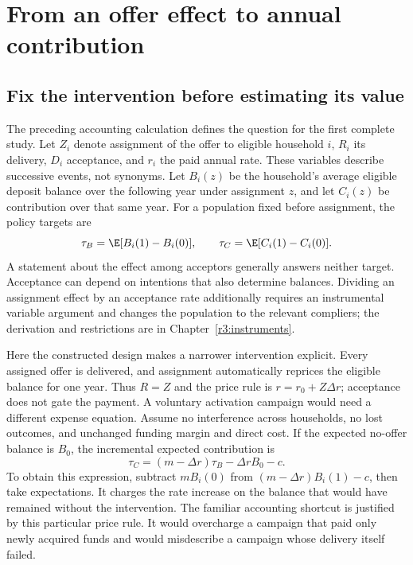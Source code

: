 \chapter{From an offer effect to annual contribution}
\label{rewrite:deposit}


\newcommand{\DepositEstimate}{1,183.47}
\newcommand{\DepositLow}{1,128.34}
\newcommand{\DepositHigh}{1,238.60}
\newcommand{\DepositNet}{2.55}
\newcommand{\DepositNetLow}{1.03}
\newcommand{\DepositNetHigh}{4.06}




\section{Fix the intervention before estimating its value}
The preceding accounting calculation defines the question for the first
complete study. Let $Z_i$ denote assignment of the offer to eligible household
$i$, $R_i$ its delivery, $D_i$ acceptance, and $r_i$ the paid annual rate.
These variables describe successive events, not synonyms. Let $B_i(z)$ be
the household's average eligible deposit balance over the following year under
assignment $z$, and let $C_i(z)$ be contribution over that same year. For a
population fixed before assignment, the policy targets are
\[
 \tau_B=\E[B_i(1)-B_i(0)],\qquad
 \tau_C=\E[C_i(1)-C_i(0)].
\]
A statement about the effect among acceptors generally answers neither target.
Acceptance can depend on intentions that also determine balances. Dividing an
assignment effect by an acceptance rate additionally requires an instrumental
variable argument and changes the population to the relevant compliers; the
derivation and restrictions are in Chapter~\ref{r3:instruments}.

Here the constructed design makes a narrower intervention explicit. Every
assigned offer is delivered, and assignment automatically reprices the eligible
balance for one year. Thus $R=Z$ and the price rule is $r=r_0+Z\Delta r$;
acceptance does not gate the payment. A voluntary activation campaign would
need a different expense equation. Assume no interference across households,
no lost outcomes, and unchanged funding margin and direct cost. If the
expected no-offer balance is $B_0$, the incremental expected contribution is
\begin{equation}
 \tau_C=(m-\Delta r)\tau_B-\Delta r B_0-c.
 \label{rewrite:value-map}
\end{equation}
To obtain this expression, subtract $mB_i(0)$ from
$(m-\Delta r)B_i(1)-c$, then take expectations. It charges the rate
increase on the balance that would have remained without the intervention.
The familiar accounting shortcut is justified by this particular price rule.
It would overcharge a campaign that paid only newly acquired funds and would
misdescribe a campaign whose delivery itself failed.

